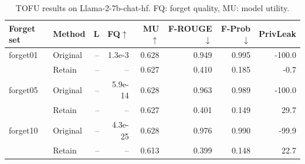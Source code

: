 \begin{table}[t]
\centering\small
\caption{TOFU results on Llama-2-7b-chat-hf. FQ: forget quality, MU: model utility.}
\begin{tabular}{llrrrrrr}
\toprule
Forget set & Method & L & FQ$\uparrow$ & MU$\uparrow$ & F-ROUGE$\downarrow$ & F-Prob$\downarrow$ & PrivLeak \\
\midrule
forget01 & Original & -- & 1.3e-3 & 0.628 & 0.949 & 0.995 & -100.0 \\
 & Retain & -- & -- & 0.627 & 0.410 & 0.185 & -0.7 \\
\midrule
forget05 & Original & -- & 5.9e-14 & 0.628 & 0.963 & 0.989 & -100.0 \\
 & Retain & -- & -- & 0.627 & 0.401 & 0.149 & 29.7 \\
\midrule
forget10 & Original & -- & 4.3e-25 & 0.628 & 0.976 & 0.990 & -99.9 \\
 & Retain & -- & -- & 0.613 & 0.399 & 0.148 & 22.7 \\
\bottomrule
\end{tabular}
\label{tab:tofu-Llama-2-7b-chat-hf}
\end{table}
